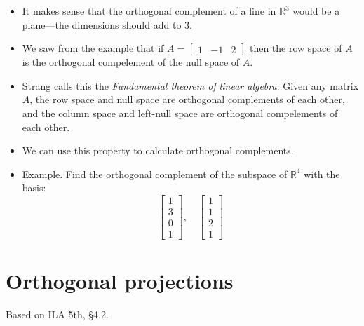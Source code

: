 \documentclass[11pt,oneside]{amsbook}
\newcommand{\RR}{\mathbb R}
\theoremstyle{definition}
\theoremstyle{plain}
\theoremstyle{definition}
\theoremstyle{remark}
\numberwithin{equation}{section}
\numberwithin{figure}{section}
\begin{document}
\begin{itemize}
  \[\begin{bmatrix}1\\1\\0\end{bmatrix}y
    +\begin{bmatrix}-2\\0\\1\end{bmatrix}z
  \]
\item It makes sense that the orthogonal complement of a line in $\RR^3$ would be a plane---the dimensions should add to $3$.
\item We saw from the example that if $A=\begin{bmatrix}1&-1&2\end{bmatrix}$ then the row space of $A$ is the orthogonal compelement of the null space of $A$.
\item Strang calls this the \emph{Fundamental theorem of linear algebra}: Given any matrix $A$, the row space and null space are orthogonal complements of each other, and the column space and left-null space are orthogonal compelements of each other.
\item We can use this property to calculate orthogonal complements.
\item Example. Find the orthogonal complement of the subspace of $\RR^4$ with the basis:
  \[\begin{bmatrix}1\\3\\0\\1\end{bmatrix},\quad
    \begin{bmatrix}1\\1\\2\\1\end{bmatrix}
  \]
  
\end{itemize}

\newpage
\section{Orthogonal projections}

Based on ILA 5th, \S 4.2.
\end{document}
